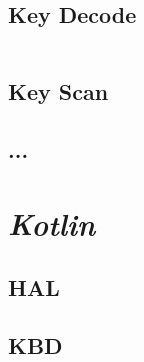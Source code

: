 \documentclass[10pt,a4paper,twocolumn]{article}
\begin{document}
\subsection{Key Decode}
\label{sec:keyDecode_VHDL}
\begin{minipage}{\linewidth}
\footnotesize
\inputminted{vhdl}{vhdl/ficheiro2.vhd}
\label{vhdl:fichiero2}
\end{minipage}

\subsection{Key Scan}
\label{sec:keyscan_VHDL}

\subsection{...}

\clearpage
\section{\textit{Kotlin}}
\subsection{HAL}

\subsection{KBD}

\end{document}
